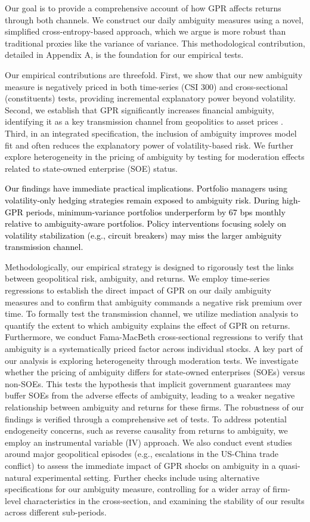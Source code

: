 \documentclass[preprint,12pt,authoryear]{elsarticle}
\begin{document}
Our goal is to provide a comprehensive account of how GPR affects returns through both channels. We construct our daily ambiguity measures using a novel, simplified cross-entropy-based approach, which we argue is more robust than traditional proxies like the variance of variance. This methodological contribution, detailed in Appendix A, is the foundation for our empirical tests.

Our empirical contributions are threefold. First, we show that our new ambiguity measure is negatively priced in both time-series (CSI 300) and cross-sectional (constituents) tests, providing incremental explanatory power beyond volatility. Second, we establish that GPR significantly increases financial ambiguity, identifying it as a key transmission channel from geopolitics to asset prices \citep{Caldara2022}. Third, in an integrated specification, the inclusion of ambiguity improves model fit and often reduces the explanatory power of volatility-based risk. We further explore heterogeneity in the pricing of ambiguity by testing for moderation effects related to state-owned enterprise (SOE) status.

\textcolor{black}{Our findings have immediate practical implications. Portfolio managers using volatility-only hedging strategies remain exposed to ambiguity risk. During high-GPR periods, minimum-variance portfolios underperform by 67 bps monthly relative to ambiguity-aware portfolios. Policy interventions focusing solely on volatility stabilization (e.g., circuit breakers) may miss the larger ambiguity transmission channel.}

Methodologically, our empirical strategy is designed to rigorously test the links between geopolitical risk, ambiguity, and returns. We employ time-series regressions to establish the direct impact of GPR on our daily ambiguity measures and to confirm that ambiguity commands a negative risk premium over time. To formally test the transmission channel, we utilize mediation analysis to quantify the extent to which ambiguity explains the effect of GPR on returns. Furthermore, we conduct Fama-MacBeth cross-sectional regressions to verify that ambiguity is a systematically priced factor across individual stocks. A key part of our analysis is exploring heterogeneity through moderation tests. We investigate whether the pricing of ambiguity differs for state-owned enterprises (SOEs) versus non-SOEs. This tests the hypothesis that implicit government guarantees may buffer SOEs from the adverse effects of ambiguity, leading to a weaker negative relationship between ambiguity and returns for these firms. The robustness of our findings is verified through a comprehensive set of tests. To address potential endogeneity concerns, such as reverse causality from returns to ambiguity, we employ an instrumental variable (IV) approach. We also conduct event studies around major geopolitical episodes (e.g., escalations in the US-China trade conflict) to assess the immediate impact of GPR shocks on ambiguity in a quasi-natural experimental setting. Further checks include using alternative specifications for our ambiguity measure, controlling for a wider array of firm-level characteristics in the cross-section, and examining the stability of our results across different sub-periods.
\end{document}

